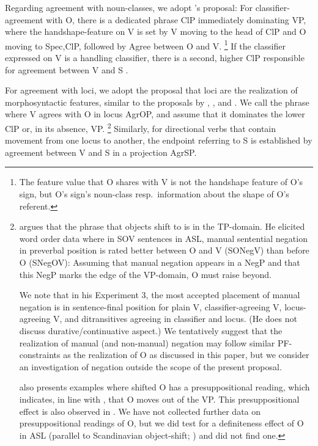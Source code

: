 \documentclass[output=paper,colorlinks,citecolor=brown,
]{langscibook}
\newcommand{\citeapos}[1]{\citeauthor{#1}'s \citeyearpar{#1}}
\begin{document}
Regarding agreement with noun-classes, we adopt \citeapos{Benedicto.Brentari.2004}
proposal: For classifier-agreement with O, there is
a dedicated phrase ClP immediately dominating VP, where the
handshape-feature on V is set by V moving to the head of ClP and O
moving to Spec,ClP, followed by Agree between O and V.%
\footnote{
    The feature value that O shares with V is not the handshape feature of O’s
    sign, but O’s sign’s noun-class resp.~information about the shape of O’s referent.
}
If the
classifier expressed on V is a handling classifier, there is a second,
higher ClP responsible for agreement between V and S \citep{Benedicto.Brentari.2004}.

For agreement with loci, we adopt the proposal that loci are the
realization of morphosyntactic features, similar to the proposals by
\citet{Neidle.etal.2000}, \citet{Kuhn.2016}, and \citet{Pfau.etal.2018}. We call the
phrase where V agrees with O in locus AgrOP, and assume that it
dominates the lower ClP or, in its absence, VP.%
\footnote{
    \citet{Gokgoz.2013} argues that the phrase that objects shift to is in the
    TP-domain. He elicited word order data where in SOV sentences in ASL, manual
    sentential negation in preverbal position is rated better between O and V (SONegV)
    than before O (SNegOV): Assuming that manual negation appears in a NegP and
    that this NegP marks the edge of the VP-domain, O must raise beyond.
    
    We note that in his Experiment 3, the most accepted placement of manual
    negation is in sentence-final position for plain V, classifier-agreeing V,
    locus-agreeing V, and ditransitives agreeing in classifier and locus. (He does not
    discuss durative/continuative aspect.) We tentatively suggest that the realization of
    manual (and non-manual) negation may follow similar PF-constraints as the
    realization of O as discussed in this paper, but we consider an investigation of
    negation outside the scope of the present proposal.
    
    \citeauthor{Gokgoz.2013} also presents examples where shifted O has a presuppositional
    reading, which indicates, in line with \citet{Diesing1992}, that O moves out of the VP.
    This presuppositional effect is also observed in \citet{Napoli.SS.RMQ.2017}. We have not
    collected further data on presuppositional readings of O, but we did test for a
    definiteness effect of O in ASL (parallel to Scandinavian object-shift; \citealp{Holmberg:1986})
    and did not find one.
}
Similarly, for
directional verbs that contain movement from one locus to another, the
endpoint referring to S is established by agreement between V and S
in a projection AgrSP.
\end{document}
